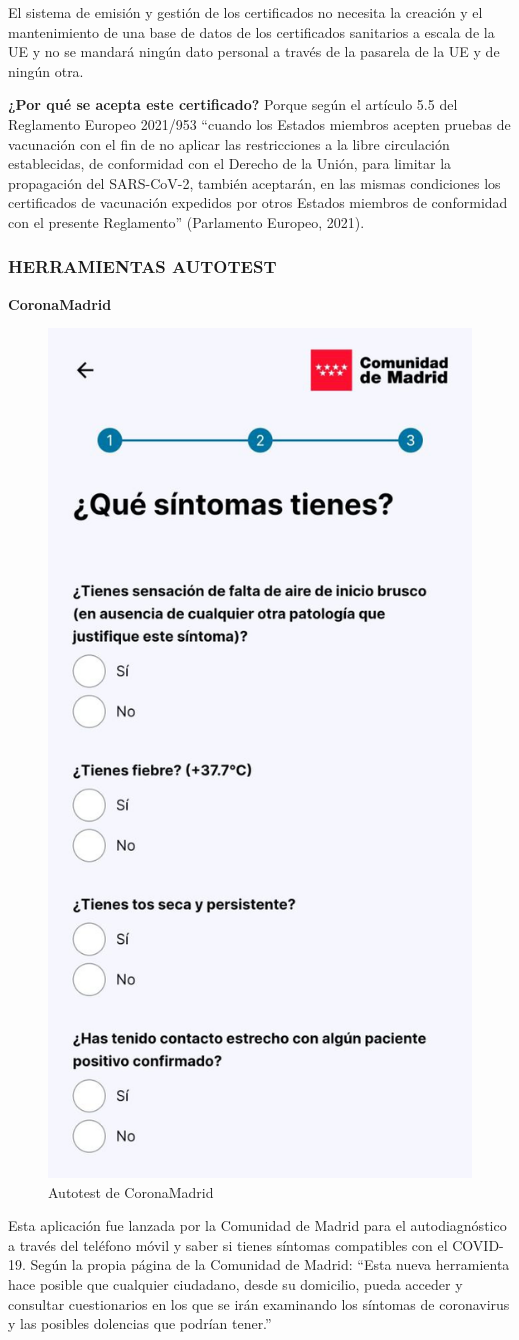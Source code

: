 \documentclass[11pt,a4paper,spanish]{article}
\begin{document}
El sistema de emisión y gestión de los certificados no necesita la creación y el mantenimiento de una base de datos de los certificados sanitarios a escala de la UE y no se mandará ningún dato personal a través de la pasarela de la UE y de ningún otra.

\textbf{¿Por qué se acepta este certificado?} Porque según el artículo 5.5 del Reglamento Europeo 2021/953 “cuando los Estados miembros acepten pruebas de vacunación con el fin de no aplicar las restricciones a la libre circulación establecidas, de conformidad con el Derecho de la Unión, para limitar la propagación del SARS-CoV-2, también aceptarán, en las mismas condiciones los certificados de vacunación expedidos por otros Estados miembros de conformidad con el presente Reglamento” (Parlamento Europeo, 2021).

\subsubsection{HERRAMIENTAS AUTOTEST}
\textbf{CoronaMadrid}

\begin{figure}[h!]
  \centering
  \includegraphics[width=0.35\linewidth]{2.png} 
  \caption{Autotest de CoronaMadrid}
\end{figure}

Esta aplicación fue lanzada por la Comunidad de Madrid para el autodiagnóstico a través del teléfono móvil y saber si tienes síntomas compatibles con el COVID-19. Según la propia página de la Comunidad de Madrid: “Esta nueva herramienta hace posible que cualquier ciudadano, desde su domicilio, pueda acceder y consultar cuestionarios en los que se irán examinando los síntomas de coronavirus y las posibles dolencias que podrían tener.”
\end{document}
